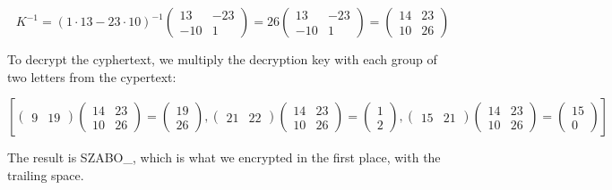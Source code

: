\documentclass[a4paper,12pt]{article}
\begin{document}
$$ K^{-1} = (1 \cdot 13 - 23 \cdot 10)^{-1}\begin{pmatrix}
13&-23\\
-10 & 1
\end{pmatrix} = 26 \begin{pmatrix}
13&-23\\
-10 & 1
\end{pmatrix} = \begin{pmatrix}
14 & 23\\
10 & 26
\end{pmatrix} $$

To decrypt the cyphertext, we multiply the decryption key with each group of two letters from the cypertext:

$$ \left[\begin{pmatrix}
9 & 19
\end{pmatrix}
\begin{pmatrix}
14 & 23\\
10 & 26
\end{pmatrix}
=
\begin{pmatrix}
19 \\
26
\end{pmatrix},
\begin{pmatrix}
21 & 22
\end{pmatrix}
\begin{pmatrix}
14 & 23\\
10 & 26
\end{pmatrix}
=
\begin{pmatrix}
1 \\
2
\end{pmatrix},
\begin{pmatrix}
15 & 21
\end{pmatrix}
\begin{pmatrix}
14 & 23\\
10 & 26
\end{pmatrix}
=
\begin{pmatrix}
15 \\
0
\end{pmatrix}\right]$$

The result is SZABO\_, which is what we encrypted in the first place, with the trailing space. 
\end{document}
